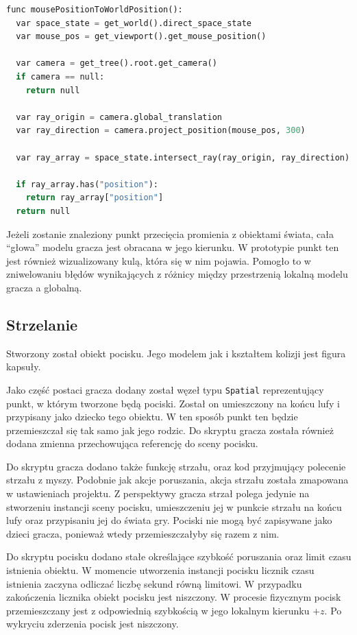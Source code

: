 \begin{lstlisting}[language=python,caption=Funkcja rzutująca mysz na świat gry, label=lst:mouse_to_world,basicstyle=\footnotesize\ttfamily]
func mousePositionToWorldPosition():
  var space_state = get_world().direct_space_state
  var mouse_pos = get_viewport().get_mouse_position()

  var camera = get_tree().root.get_camera()
  if camera == null:
    return null

  var ray_origin = camera.global_translation
  var ray_direction = camera.project_position(mouse_pos, 300)

  var ray_array = space_state.intersect_ray(ray_origin, ray_direction)

  if ray_array.has("position"):
    return ray_array["position"]
  return null
\end{lstlisting}

Jeżeli zostanie znaleziony punkt przecięcia promienia z obiektami świata, cała ``głowa'' modelu gracza jest obracana w jego kierunku. W prototypie punkt ten jest również wizualizowany kulą, która się w nim pojawia. Pomogło to w zniwelowaniu błędów wynikających z różnicy między przestrzenią lokalną modelu gracza a globalną. 

\subsection{Strzelanie}
Stworzony został obiekt pocisku. Jego modelem jak i kształtem kolizji jest figura kapsuły. 

Jako część postaci gracza dodany został węzeł typu \texttt{Spatial} reprezentujący punkt, w którym tworzone będą pociski. Został on umieszczony na końcu lufy i przypisany jako dziecko tego obiektu. W ten sposób punkt ten będzie przemieszczał się tak samo jak jego rodzic. Do skryptu gracza została również dodana zmienna przechowująca referencję do sceny pocisku.

Do skryptu gracza dodano także funkcję strzału, oraz kod przyjmujący polecenie strzału z myszy. Podobnie jak akcje poruszania, akcja strzału została zmapowana w ustawieniach projektu. Z perspektywy gracza strzał polega jedynie na stworzeniu instancji sceny pocisku, umieszczeniu jej w punkcie strzału na końcu lufy oraz przypisaniu jej do świata gry. Pociski nie mogą być zapisywane jako dzieci gracza, ponieważ wtedy przemieszczałyby się razem z nim.

Do skryptu pocisku dodano stałe określające szybkość poruszania oraz limit czasu istnienia obiektu. W momencie utworzenia instancji pocisku licznik czasu istnienia zaczyna odliczać liczbę sekund równą limitowi. W przypadku zakończenia licznika obiekt pocisku jest niszczony. W procesie fizycznym pocisk przemieszczany jest z odpowiednią szybkością w jego lokalnym kierunku $+z$. Po wykryciu zderzenia pocisk jest niszczony.   

